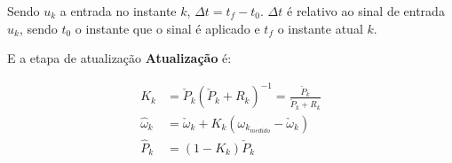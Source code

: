 Sendo $u_k$ a entrada no instante $k$, $\Delta t = t_f - t_0$. $\Delta t$ é relativo ao sinal de entrada $u_k$, sendo $t_0$ o instante que o sinal é aplicado e $t_f$ o instante atual $k$.


E a etapa de atualização \textbf{Atualização} é:

\begin{align*}
K_k &= \check{P}_k \left( \check{P}_k + R_k \right)^{-1} = \frac{\check{P}_k}{\check{P}_k + R_k}\\
\hat{\omega}_k &= \check{\omega}_k + K_k \left( \omega_{k_{medido}} - \check{\omega}_k \right)\\
\hat{P}_k &= \left( 1 - K_k \right) \check{P}_k
\end{align*}



        
        
        
        
        
        
        
        
